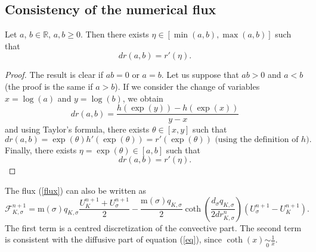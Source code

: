 \documentclass[smallextended]{svjour3}
\newcommand{\ds}{\displaystyle}
\begin{document}

\subsection{Consistency of the numerical flux}

\begin{lemma}
Let $a$, $b \in \mathbb{R}$, $a,b \geq 0$. Then there exists $\eta \in [\min(a,b),\max(a,b)]$ such that 
\begin{equation*}
dr(a,b)=r'(\eta).
\end{equation*}
\label{propdr}
\end{lemma}

\begin{proof}
The result is clear if $ab=0$ or $a=b$. Let us suppose that $ab>0$ and $a < b$ (the proof is the same if $a>b$). If we consider the change of variables $x=\log(a)$ and $y=\log(b)$, we obtain
\begin{equation*}
dr(a,b)=\frac{h(\exp(y))-h(\exp(x))}{y-x}
\end{equation*}
and using Taylor's formula, there exists $\theta \in [x,y]$ such that 
\begin{equation*}
dr(a,b)=\exp(\theta)h'(\exp(\theta))=r'(\exp(\theta)) \text{ (using the definition of $h$). }
\end{equation*}
Finally, there exists $\eta=\exp(\theta) \in [a,b]$ such that 
\begin{equation*}
dr(a,b)=r'(\eta).
\end{equation*}
\end{proof}



\begin{remark}
The flux (\ref{flux}) can also be written as
\begin{equation}
\mathcal{F}_{K,\sigma}^{n+1}=\text{m}(\sigma)q_{K,\sigma}\frac{U_{K}^{n+1}+U^{n+1}_{\sigma}}{2}-\frac{\text{m}(\sigma)q_{K,\sigma}}{2}\coth \left(\frac{d_{\sigma}q_{K,\sigma}}{2dr^{n}_{K,\sigma}}\right)(U^{n+1}_{\sigma}-U^{n+1}_{K}).
\label{flux2}
\end{equation}
The first term is a centred discretization of the convective part. The second term is consistent with the diffusive part of equation (\ref{eq}), since $\ds{\coth(x)\underset{0}{\sim}\frac{1}{x}}$.
\end{remark}





\end{document}
